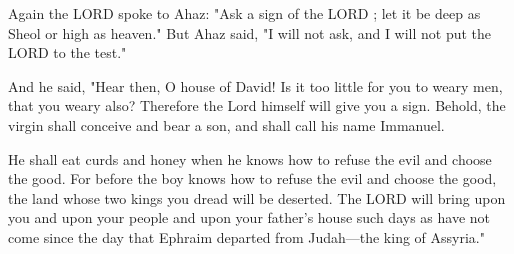 \documentclass[11pt]{article}
\begin{document}
\begin{biblicaloutline}[Isaiah 7:10-17]

    
    \begin{versesection}{2em}
         Again the LORD spoke to Ahaz:  "Ask a sign of the LORD ; let it be deep as Sheol or high as heaven."  But Ahaz said, "I will not ask, and I will not put the LORD to the test."
    \end{versesection}
    
    
    \begin{versesection}{2em}
         And he said, "Hear then, O house of David! Is it too little for you to weary men, that you weary  also?  Therefore the Lord himself will give you a sign. Behold, the virgin shall conceive and bear a son, and shall call his name Immanuel.
    \end{versesection}
    
    
    \begin{versesection}{2em}
         He shall eat curds and honey when he knows how to refuse the evil and choose the good.  For before the boy knows how to refuse the evil and choose the good, the land whose two kings you dread will be deserted.  The LORD will bring upon you and upon your people and upon your father's house such days as have not come since the day that Ephraim departed from Judah—the king of Assyria."
    \end{versesection}

\end{biblicaloutline}

\newpage
\end{document}
